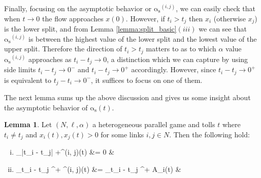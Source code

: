 \documentclass[10pt,a4paper]{book}
\newcommand{\as}{\mathrm{\alpha_s}}
\theoremstyle{definition}
\newtheorem{lemma}[definition]{Lemma}
\theoremstyle{comment}
\begin{document}
Finally, focusing on the asymptotic behavior or $\as^{(i, j)}$, we can easily check that when $t \rightarrow 0$ the flow approaches $x(0)$.
However, if $t_i > t_j$ then $x_i$ (otherwise $x_j$) is the lower split, and from Lemma \ref{lemma:split_basic}$(iii)$ we can see that $\as^{(i, j)}$ is between the highest value of the lower split and the lowest value of the upper split.
Therefore the direction of $t_i > t_j$ matters to as to which $\alpha$ value $\as^{(i, j)}$ approaches as $t_i - t_j \rightarrow 0$, a distinction which we can capture by using side limits $t_i - t_j \rightarrow 0^-$ and $t_i - t_j \rightarrow 0^+$ accordingly.
However, since $t_i - t_j \rightarrow 0^+$ is equivalent to $t_j - t_i \rightarrow 0^-$, it suffices to focus on one of them.

The next lemma sums up the above discussion and gives us some insight about the asymptotic behavior of $\as(t)$.
\begin{lemma}
	\label{lemma:split_asymptotic}
	Let $(N, \ell, \alpha)$ a heterogeneous parallel game and tolls $t$ where $t_i \ne t_j$ and $x_i(t), x_j(t) > 0$ for some links $i, j \in N$.
	Then the following hold:
	\begin{enumerate}[(i)]
		\item
		\begin{flalign*}
			\lim_{|t_i - t_j| \rightarrow +\infty}\as^{(i, j)}(t) &= 0 &
		\end{flalign*}
		\item
		\begin{flalign*}
			\lim_{t_i - t_j ^+} \as^{(i, j)}(t) &= \limsup_{t_i - t_j ^+} A_i(t) &
		\end{flalign*}
	\end{enumerate}
\end{lemma}
\end{document}
